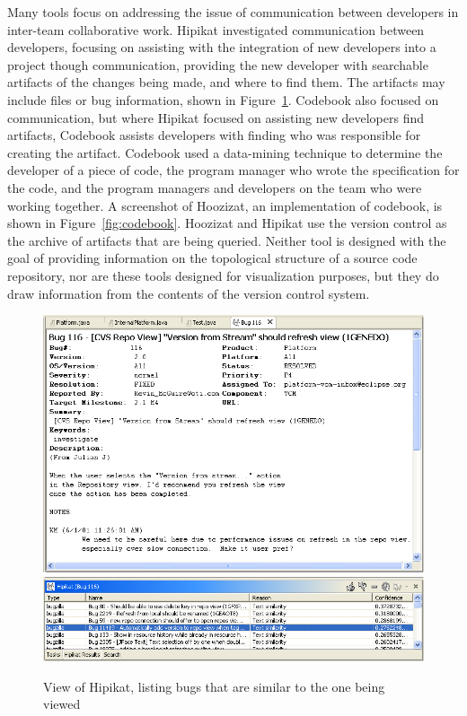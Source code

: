 Many tools focus on addressing the issue of communication between
developers in inter-team collaborative work. Hipikat\cite{Cubranic2005}
investigated communication between developers, focusing on assisting
with the integration of new developers into a project though
communication, providing the new developer with searchable artifacts of
the changes being made, and where to find them. The artifacts may
include files or bug information, shown in Figure~\ref{fig:hipikat}.
Codebook\cite{Begel2010} also focused on communication, but where
Hipikat focused on assisting new developers find artifacts, Codebook
assists developers with finding who was responsible for creating the
artifact. Codebook used a data-mining technique to determine the
developer of a piece of code, the program manager who wrote the
specification for the code, and the program managers and developers on
the team who were working together. A screenshot of Hoozizat, an
implementation of codebook, is shown in Figure~\ref{fig:codebook}.
Hoozizat and Hipikat use the version control as the archive of artifacts
that are being queried. Neither tool is designed with the goal of
providing information on the topological structure of a source code
repository, nor are these tools designed for visualization purposes, but
they do draw information from the contents of the version control
system.

\begin{figure}[htpb]
  \centering
  \includegraphics[width=0.9\linewidth]{Figures/introduction/hipikat_bug.png}
  \includegraphics[width=0.9\linewidth]{Figures/introduction/hipikat.png}
  \caption{View of Hipikat, listing bugs that are similar to the one
  being viewed}
  \label{fig:hipikat}
\end{figure}

